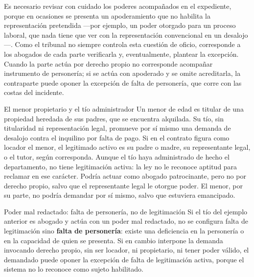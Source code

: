 \documentclass[12pt,oneside]{book}
\begin{document}
Es necesario revisar con cuidado los poderes acompañados en el expediente, porque en ocasiones se presenta un apoderamiento que no habilita la representación pretendida ---por ejemplo, un poder otorgado para un proceso laboral, que nada tiene que ver con la representación convencional en un desalojo---. Como el tribunal no siempre controla esta cuestión de oficio, corresponde a los abogados de cada parte verificarla y, eventualmente, plantear la excepción. Cuando la parte actúa por derecho propio no corresponde acompañar instrumento de personería; si se actúa con apoderado y se omite acreditarla, la contraparte puede oponer la excepción de falta de personería, que corre con las costas del incidente.

\begin{example}{El menor propietario y el tío administrador}
Un menor de edad es titular de una propiedad heredada de sus padres, que se encuentra alquilada. Su tío, sin titularidad ni representación legal, promueve por sí mismo una demanda de desalojo contra el inquilino por falta de pago. Si en el contrato figura como locador el menor, el legitimado activo es su padre o madre, su representante legal, o el tutor, según corresponda. Aunque el tío haya administrado de hecho el departamento, no tiene legitimación activa: la ley no le reconoce aptitud para reclamar en ese carácter. Podría actuar como abogado patrocinante, pero no por derecho propio, salvo que el representante legal le otorgue poder. El menor, por su parte, no podría demandar por sí mismo, salvo que estuviera emancipado.
\end{example}

\begin{example}{Poder mal redactado: falta de personería, no de legitimación}
Si el tío del ejemplo anterior es abogado y actúa con un poder mal redactado, no se configura falta de legitimación sino \textbf{falta de personería}: existe una deficiencia en la personería o en la capacidad de quien se presenta. Si en cambio interpone la demanda invocando derecho propio, sin ser locador, ni propietario, ni tener poder válido, el demandado puede oponer la excepción de falta de legitimación activa, porque el sistema no lo reconoce como sujeto habilitado.
\end{example}
\end{document}
